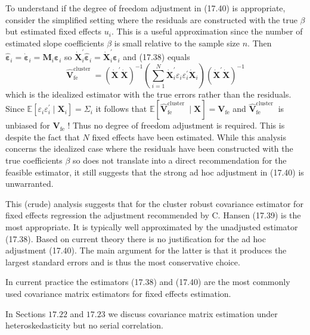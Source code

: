 \documentclass[10pt]{article}
\begin{document}
To understand if the degree of freedom adjustment in (17.40) is appropriate, consider the simplified setting where the residuals are constructed with the true $\beta$ but estimated fixed effects $u_{i}$. This is a useful approximation since the number of estimated slope coefficients $\beta$ is small relative to the sample size $n$. Then $\widehat{\boldsymbol{\varepsilon}}_{i}=\dot{\boldsymbol{\varepsilon}}_{i}=\boldsymbol{M}_{i} \boldsymbol{\varepsilon}_{i}$ so $\dot{\boldsymbol{X}}_{i}^{\prime} \widehat{\boldsymbol{\varepsilon}}_{i}=\dot{\boldsymbol{X}}_{i}^{\prime} \boldsymbol{\varepsilon}_{i}$ and (17.38) equals
$$
\widehat{\boldsymbol{V}}_{\mathrm{fe}}^{\text {cluster }}=\left(\dot{\boldsymbol{X}}^{\prime} \dot{\boldsymbol{X}}\right)^{-1}\left(\sum_{i=1}^{N} \dot{\boldsymbol{X}}_{i}^{\prime} \varepsilon_{i} \varepsilon_{i}^{\prime} \dot{\boldsymbol{X}}_{i}\right)\left(\dot{\boldsymbol{X}}^{\prime} \dot{\boldsymbol{X}}\right)^{-1}
$$
which is the idealized estimator with the true errors rather than the residuals. Since $\mathbb{E}\left[\varepsilon_{i} \varepsilon_{i}^{\prime} \mid \boldsymbol{X}_{i}\right]=\Sigma_{i}$ it follows that $\mathbb{E}\left[\widehat{\boldsymbol{V}}_{\mathrm{fe}}^{\text {cluster }} \mid \boldsymbol{X}\right]=\boldsymbol{V}_{\mathrm{fe}}$ and $\widehat{\boldsymbol{V}}_{\mathrm{fe}}^{\text {cluster }}$ is unbiased for $\boldsymbol{V}_{\mathrm{fe}}$ ! Thus no degree of freedom adjustment is required. This is despite the fact that $N$ fixed effects have been estimated. While this analysis concerns the idealized case where the residuals have been constructed with the true coefficients $\beta$ so does not translate into a direct recommendation for the feasible estimator, it still suggests that the strong ad hoc adjustment in (17.40) is unwarranted.

This (crude) analysis suggests that for the cluster robust covariance estimator for fixed effects regression the adjustment recommended by C. Hansen (17.39) is the most appropriate. It is typically well approximated by the unadjusted estimator (17.38). Based on current theory there is no justification for the ad hoc adjustment (17.40). The main argument for the latter is that it produces the largest standard errors and is thus the most conservative choice.

In current practice the estimators (17.38) and (17.40) are the most commonly used covariance matrix estimators for fixed effects estimation.

In Sections $17.22$ and $17.23$ we discuss covariance matrix estimation under heteroskedasticity but no serial correlation.
\end{document}
